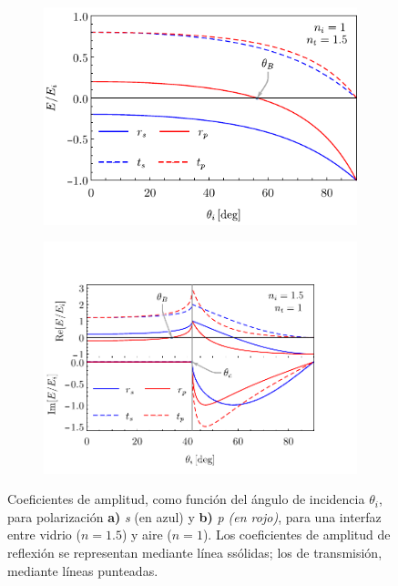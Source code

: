 \begin{figure}[b!]\centering
	\begin{subfigure}{.05\textwidth}\vspace{-4.75cm}\caption{}\label{sfig:coefExt}\end{subfigure}
	\begin{subfigure}{.43\textwidth} \hspace*{-1cm}
	\includegraphics[scale=1,trim={00 00 00 00}, clip]{1-Teoria/figs/0-ampCoefExt}
	\end{subfigure}
	\begin{subfigure}{.05\textwidth}\vspace{-4.75cm}\caption{}\label{sfig:coefInt}\end{subfigure}
	\begin{subfigure}{.43\textwidth} \hspace*{-.9cm}
	\includegraphics[scale=.7,trim={00 10 50 50 }, clip]{1-Teoria/figs/0-ampCoefInt}
	\end{subfigure}\vspace*{-.7em}
	\caption{ Coeficientes de amplitud, como función del ángulo de incidencia $\theta_i$, para polarización \textbf{a)} \emph{s} (en azul) y \textbf{b)} \emph{p (en rojo)}, para una interfaz entre vidrio ($n=1.5$) y aire ($n=1$).  Los coeficientes de amplitud de reflexión se representan mediante línea ssólidas; los de transmisión, mediante líneas punteadas.}	\label{fig:coefAmp}	
	\end{figure}	



